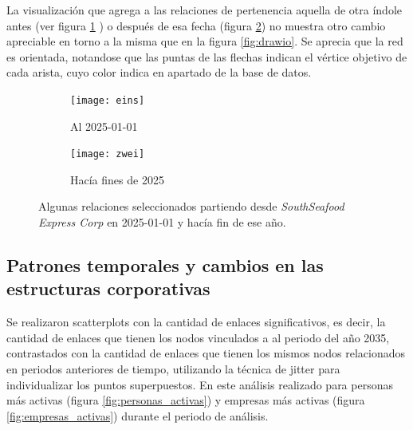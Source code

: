 \documentclass[11pt,spanish,a4paper]{article}
\begin{document}
La visualización que agrega a las relaciones de pertenencia aquella de otra índole antes (ver figura \ref{fig:antes} ) o después de esa fecha (figura \ref{fig:después}) no muestra otro cambio apreciable en torno a la misma que en la figura \ref{fig:drawio}.
Se aprecia que la red es orientada, notandose que las puntas de las flechas indican el vértice objetivo de cada arista, cuyo color indica en apartado de la base de datos.

\break


\begin{figure}[!ht]
	\centering
	\begin{subfigure}[b]{\textwidth}
		\centering
		\texttt{[image: eins]}
		\caption{Al 2025-01-01}
		\label{fig:antes}
	\end{subfigure}
	\begin{subfigure}[b]{\textwidth}
		\centering
		\texttt{[image: zwei]}
		\caption{Hacía fines de 2025}
		\label{fig:después}
	\end{subfigure}
	\caption{
		Algunas relaciones seleccionados partiendo desde \emph{SouthSeafood Express Corp} en 2025-01-01 y hacía fin de ese año.		
		}
	\label{fig:Networkx}
\end{figure}
\vspace{3cm}


\break

\subsection{Patrones temporales y cambios en las estructuras corporativas}

Se realizaron scatterplots con la cantidad de enlaces significativos, es decir, la cantidad de enlaces que tienen los nodos vinculados a al periodo del año 2035, contrastados con la cantidad de enlaces que tienen los mismos nodos relacionados en periodos anteriores de tiempo, utilizando la técnica de jitter para individualizar los puntos superpuestos.
En este análisis realizado para personas más activas (figura \ref{fig:personas_activas}) y empresas más activas (figura \ref{fig:empresas_activas}) durante el periodo de análisis. 
\end{document}
